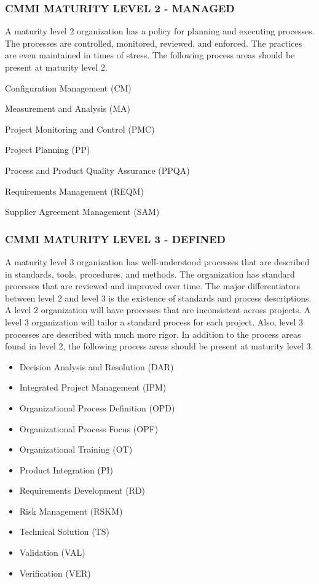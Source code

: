 \documentclass[SDSUThesis.tex]{subfiles}
\begin{document}
\subsubsection{CMMI MATURITY LEVEL 2 - MANAGED}
    A maturity level 2 organization has a policy for planning and executing processes.  
    The processes are controlled, monitored, reviewed, and enforced.  The practices are even
    maintained in times of stress.  The following process areas should be present at maturity
    level 2.
    \begin{description}
        \item Configuration Management (CM)
        \item Measurement and Analysis (MA)
        \item Project Monitoring and Control (PMC)
        \item Project Planning (PP)
        \item Process and Product Quality Assurance (PPQA)
        \item Requirements Management (REQM)
        \item Supplier Agreement Management (SAM)
    \end{description}

\subsubsection{CMMI MATURITY LEVEL 3 - DEFINED}
    A maturity level 3 organization has well-understood processes that are described in 
    standards, tools, procedures, and methods.  The organization has standard processes
    that are reviewed and improved over time.  The major differentiators between level 2 
    and level 3 is the existence of standards and process descriptions. 
    A level 2 organization will have
    processes that are inconsistent across projects.  A level 3 organization will tailor
    a standard process for each project.  Also, level 3 processes are described with 
    much more rigor.  In addition to the process areas found in level 2, 
    the following process areas should be present at maturity level 3.
    \begin{itemize}
        \item Decision Analysis and Resolution (DAR)
        \item Integrated Project Management (IPM)
        \item Organizational Process Definition (OPD)
        \item Organizational Process Focus (OPF)
        \item Organizational Training (OT)
        \item Product Integration (PI)
        \item Requirements Development (RD)
        \item Risk Management (RSKM)
        \item Technical Solution (TS)
        \item Validation (VAL)
        \item Verification (VER)
    \end{itemize}
    
\end{document}
